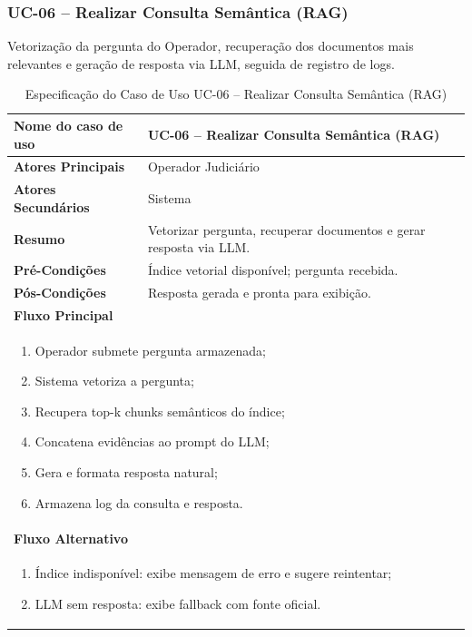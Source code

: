 \begin{description}
\subsubsection{UC-06 – Realizar Consulta Semântica (RAG)}
\noindent Vetorização da pergunta do Operador, recuperação dos documentos mais relevantes e geração de resposta via LLM, seguida de registro de logs.
\begin{table}[H]
  \centering
  \caption{Especificação do Caso de Uso UC-06 – Realizar Consulta Semântica (RAG)}
  \label{tab:uc06}
  \begin{tabular}{|p{4cm}|p{11cm}|}
    \hline
    \textbf{Nome do caso de uso}    & UC-06 – Realizar Consulta Semântica (RAG) \\ \hline
    \textbf{Atores Principais}      & Operador Judiciário                       \\ \hline
    \textbf{Atores Secundários}     & Sistema                                   \\ \hline
    \textbf{Resumo}                 & Vetorizar pergunta, recuperar documentos e gerar resposta via LLM. \\ \hline
    \textbf{Pré-Condições}          & Índice vetorial disponível; pergunta recebida. \\ \hline
    \textbf{Pós-Condições}          & Resposta gerada e pronta para exibição. \\ \hline
    \multicolumn{2}{|l|}{\textbf{Fluxo Principal}} \\ \hline
    \multicolumn{2}{|p{15cm}|}{%
      \begin{enumerate}[leftmargin=*]
        \item Operador submete pergunta armazenada;
        \item Sistema vetoriza a pergunta;
        \item Recupera top-k chunks semânticos do índice;
        \item Concatena evidências ao prompt do LLM;
        \item Gera e formata resposta natural;
        \item Armazena log da consulta e resposta.
      \end{enumerate}
    } \\ \hline
    \multicolumn{2}{|l|}{\textbf{Fluxo Alternativo}} \\ \hline
    \multicolumn{2}{|p{15cm}|}{%
      \begin{enumerate}[label=\arabic* a\,.]
        \item Índice indisponível: exibe mensagem de erro e sugere reintentar;
        \item LLM sem resposta: exibe fallback com fonte oficial.
      \end{enumerate}
    } \\ \hline
  \end{tabular}
\end{table}


\end{description}
